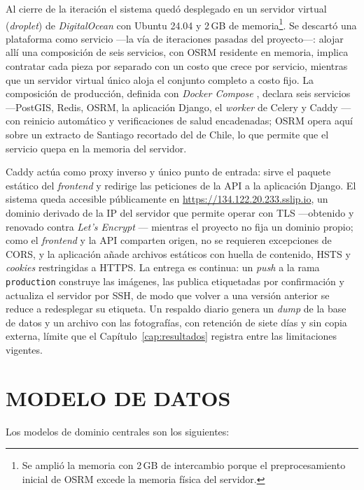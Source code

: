 Al cierre de la iteración el sistema quedó desplegado en un servidor virtual (\textit{droplet}) de
\textit{DigitalOcean} con Ubuntu 24.04 y 2\,GB de memoria\footnote{Se amplió la memoria con 2\,GB
de intercambio porque el preprocesamiento inicial de OSRM excede la memoria física del servidor.}.
Se descartó una plataforma como servicio ---la vía de iteraciones pasadas del proyecto---: alojar
allí una composición de seis servicios, con OSRM residente en memoria, implica contratar cada pieza
por separado con un costo que crece por servicio, mientras que un servidor virtual único aloja el
conjunto completo a costo fijo. La composición de producción, definida con \textit{Docker Compose}
\citep{merkel2014docker,dockercompose}, declara seis servicios ---PostGIS, Redis, OSRM, la
aplicación Django, el \textit{worker} de Celery y Caddy \citep{caddy}--- con reinicio automático y
verificaciones de salud encadenadas; OSRM opera aquí sobre un extracto de Santiago recortado del de
Chile, lo que permite que el servicio quepa en la memoria del servidor.

Caddy actúa como proxy inverso y único punto de entrada: sirve el paquete estático del
\textit{frontend} y redirige las peticiones de la API a la aplicación Django. El sistema queda
accesible públicamente en \url{https://134.122.20.233.sslip.io}, un dominio derivado de la IP del
servidor que permite operar con TLS ---obtenido y renovado contra \textit{Let's Encrypt}
\citep{letsencrypt}--- mientras el proyecto no fija un dominio propio; como el \textit{frontend} y
la API comparten origen, no se requieren excepciones de CORS, y la aplicación añade archivos
estáticos con huella de contenido, HSTS y \textit{cookies} restringidas a HTTPS. La entrega es
continua: un \textit{push} a la rama \texttt{production} construye las imágenes, las publica
etiquetadas por confirmación y actualiza el servidor por SSH, de modo que volver a una versión
anterior se reduce a redesplegar su etiqueta. Un respaldo diario genera un \textit{dump} de la base
de datos y un archivo con las fotografías, con retención de siete días y sin copia externa, límite
que el Capítulo~\ref{cap:resultados} registra entre las limitaciones vigentes.

\section{MODELO DE DATOS}
\label{sec:modelo-datos}

Los modelos de dominio centrales son los siguientes:

